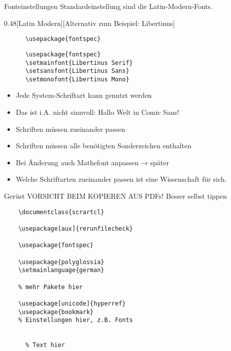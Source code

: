 \begin{frame}[fragile]{
  Fonteinstellungen
  \hfill
}
  Standardeinstellung sind die Latin-Modern-Fonts.
  \vspace{1em}
  \begin{CodeExplanation}{0.48}[Latin Modern][Alternativ zum Beispiel: Libertinus]
    \begin{lstlisting}
      \usepackage{fontspec}
    \end{lstlisting}
  \Explanation
    \begin{lstlisting}
      \usepackage{fontspec}
      \setmainfont{Libertinus Serif}
      \setsansfont{Libertinus Sans}
      \setmonofont{Libertinus Mono}
    \end{lstlisting}
  \end{CodeExplanation}
  \begin{itemize}
    \item Jede System-Schriftart kann genutzt werden
    \item \alert{Das ist i.A. nicht sinnvoll:  Hallo Welt in Comic Sans!}
    \item Schriften müssen zueinander passen
    \item Schriften müssen alle benötigten Sonderzeichen enthalten
    \item Bei Änderung auch Mathefont anpassen → später
    \item Welche Schriftarten zueinander passen ist eine Wissenschaft für sich.
  \end{itemize}
\end{frame}

\begin{frame}[fragile]{Gerüst}
  \alert{VORSICHT BEIM KOPIEREN AUS PDFs! Besser selbst tippen}

  \begin{lstlisting}
    \documentclass{scrartcl}

    \usepackage[aux]{rerunfilecheck}

    \usepackage{fontspec}

    \usepackage{polyglossia}
    \setmainlanguage{german}

    % mehr Pakete hier

    \usepackage[unicode]{hyperref}
    \usepackage{bookmark}
    % Einstellungen hier, z.B. Fonts

    
      % Text hier
    
  \end{lstlisting}
\end{frame}

